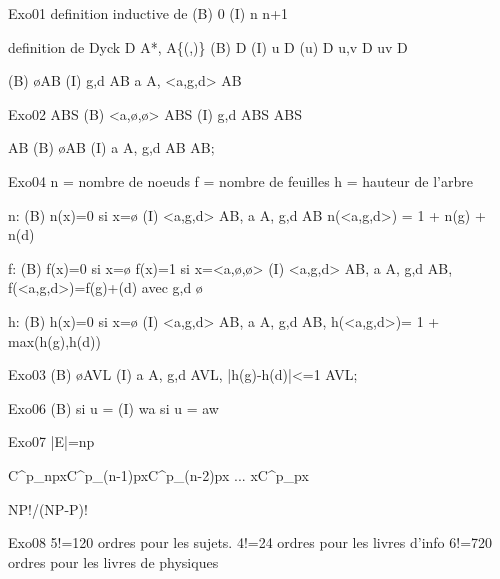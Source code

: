 Exo01
definition inductive de \N
(B) 0 \in \N
(I) n \in \N \rightarrow n+1 \in \N


definition de Dyck D \sebseteq A*, A\{(,)\}
(B) \varepsilon \in D
(I) 	u \in D \rightarrow (u) \in D
		u,v \in D \rightarrow uv \in D

(B) \o \in AB
(I) g,d \in AB \rightarrow \forall a \in A, <a,g,d> \in AB

Exo02
ABS
(B) <a,\o,\o> \in ABS
(I) g,d \in ABS  \in ABS

AB
(B) \o \in AB
(I) \forall a \in A, g,d \in AB 
	\rightarrow <a,g,d> \in AB;

Exo04
n = nombre de noeuds
f = nombre de feuilles
h = hauteur de l'arbre

n:
(B) n(x)=0 si x=\o
(I) <a,g,d> \in AB, a \in A, g,d \in AB 		\rightarrow n(<a,g,d>) = 1 + n(g) + n(d)

f:
(B) f(x)=0 si x=\o
	f(x)=1 si x=<a,\o,\o>
(I) <a,g,d> \in AB, a \in A, g,d \in AB,
	\rightarrow f(<a,g,d>)=f(g)+(d) avec g,d \ne \o

h:
(B) h(x)=0 si x=\o
(I) <a,g,d> \in AB, a \in A, g,d \in AB,
	\rightarrow h(<a,g,d>)= 1 + max(h(g),h(d))

Exo03
(B) \o \in AVL
(I) \forall a \in A, g,d \in AVL, 
	|h(g)-h(d)|<=1 
	\rightarrow <a,g,d> \in AVL;


Exo06
(B) \varepsilon si u = \varepsilon
(I) wa si u = aw

Exo07
|E|=np

C^p_{np}xC^p_{(n-1)p}xC^p_{(n-2)p}x ... xC^p_{p}x

NP!/(NP-P)!

Exo08
5!=120 ordres pour les sujets.
4!=24 ordres pour les livres d'info
6!=720 ordres pour les livres de physiques